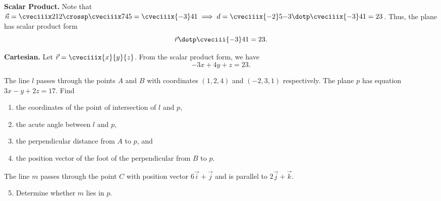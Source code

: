 \begin{solution}
\begin{ppart}
        \textbf{Scalar Product.} Note that $\vec n = \cveciiix212 \crossp \cveciiix745 = \cveciiix{-3}41 \implies d = \cveciiix{-2}5{-3} \dotp \cveciiix{-3}41 = 23$. Thus, the plane has scalar product form \[\vec r \dotp \cveciii{-3}41 = 23.\]

        \textbf{Cartesian.} Let $\vec r = \cveciiix{x}{y}{z}$. From the scalar product form, we have \[-3x + 4y + z = 23.\]
    \end{ppart}
\end{solution}

\begin{problem}
    The line $l$ passes through the points $A$ and $B$ with coordinates $(1, 2, 4)$ and $(-2, 3, 1)$ respectively. The plane $p$ has equation $3x - y + 2z = 17$. Find
    \begin{enumerate}
        \item the coordinates of the point of intersection of $l$ and $p$,
        \item the acute angle between $l$ and $p$,
        \item the perpendicular distance from $A$ to $p$, and
        \item the position vector of the foot of the perpendicular from $B$ to $p$.
    \end{enumerate}

     The line $m$ passes through the point $C$ with position vector $6\vec i + \vec j$ and is parallel to $2\vec j + \vec k$.

    \begin{enumerate}
        \setcounter{enumi}{4}
        \item Determine whether $m$ lies in $p$.
    \end{enumerate}
\end{problem}
